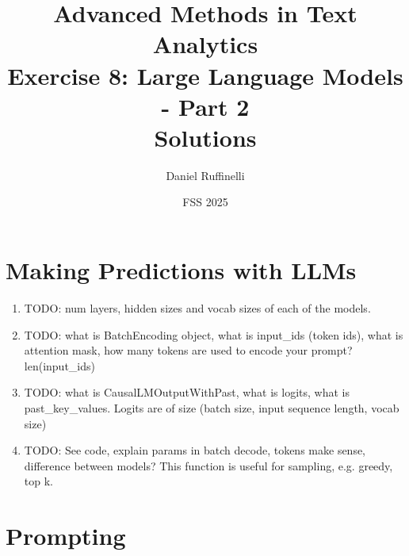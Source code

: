 \documentclass[11pt,a4paper]{article}
\title{Advanced Methods in Text Analytics \\ 
Exercise 8: Large Language Models - Part 2\\
\textbf{Solutions}}
\author{Daniel Ruffinelli}
\date{FSS 2025}
\begin{document}
\maketitle

\section{Making Predictions with LLMs}

\begin{enumerate}[label=(\alph*)]
    \item TODO: num layers, hidden sizes and vocab sizes of each of the models.
    \item TODO: what is BatchEncoding object, what is input\_ids (token ids),
          what is attention mask, how many tokens are used to encode your
          prompt? len(input\_ids)
    \item TODO: what is CausalLMOutputWithPast, what is logits, what is
          past\_key\_values. Logits are of size
          (batch size, input sequence length, vocab size)
    \item TODO: See code, explain params in batch decode, tokens make sense,
          difference between models?
          This function is useful for sampling, e.g. greedy, top k.
\end{enumerate}

\section{Prompting}
\end{document}
